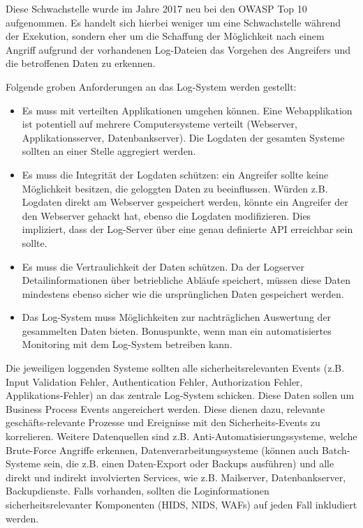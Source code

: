 Diese Schwachstelle wurde im Jahre 2017 neu bei den OWASP Top 10 aufgenommen. Es handelt sich hierbei weniger um eine Schwachstelle während der Exekution, sondern eher um die Schaffung der Möglichkeit nach einem Angriff aufgrund der vorhandenen Log-Dateien das Vorgehen des Angreifers und die betroffenen Daten zu erkennen.

Folgende groben Anforderungen an das Log-System werden gestellt:

\begin{itemize}
	\item Es muss mit verteilten Applikationen umgehen können. Eine Webapplikation ist potentiell auf mehrere Computersysteme verteilt (Webserver, Applikationsserver, Datenbankserver). Die Logdaten der gesamten Systeme sollten an einer Stelle aggregiert werden.
	\item Es muss die Integrität der Logdaten schützen: ein Angreifer sollte keine Möglichkeit besitzen, die geloggten Daten zu beeinflussen. Würden z.B. Logdaten direkt am Webserver gespeichert werden, könnte ein Angreifer der den Webserver gehackt hat, ebenso die Logdaten modifizieren. Dies impliziert, dass der Log-Server über eine genau definierte API erreichbar sein sollte.
	\item Es muss die Vertraulichkeit der Daten schützen. Da der Logserver Detailinformationen über betriebliche Abläufe speichert, müssen diese Daten mindestens ebenso sicher wie die ursprünglichen Daten gespeichert werden.
	\item Das Log-System muss Möglichkeiten zur nachträglichen Auswertung der gesammelten Daten bieten. Bonuspunkte, wenn man ein automatisiertes Monitoring mit dem Log-System betreiben kann.
\end{itemize}

Die jeweiligen loggenden Systeme sollten alle sicherheitsrelevanten Events (z.B. Input Validation Fehler, Authentication Fehler, Authorization Fehler, Applikations-Fehler) an das zentrale Log-System schicken. Diese Daten sollen um Business Process Events angereichert werden. Diese dienen dazu, relevante geschäfts-relevante Prozesse und Ereignisse mit den Sicherheits-Events zu korrelieren. Weitere Datenquellen sind z.B. Anti-Automatisierungssysteme, welche Brute-Force Angriffe erkennen, Datenverarbeitungssysteme (können auch Batch-Systeme sein, die z.B. einen Daten-Export oder Backups ausführen) und alle direkt und indirekt involvierten Services, wie z.B. Mailserver, Datenbankserver, Backupdienste. Falls vorhanden, sollten die Loginformationen sicherheitsrelevanter Komponenten (HIDS, NIDS, WAFs) auf jeden Fall inkludiert werden.

